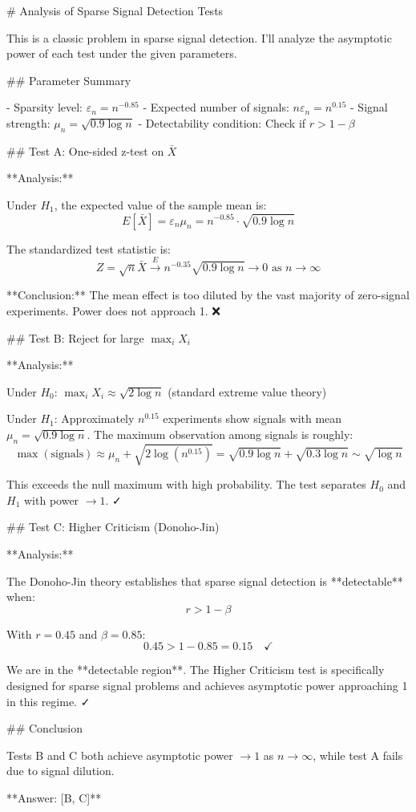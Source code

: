 # Analysis of Sparse Signal Detection Tests

This is a classic problem in sparse signal detection. I'll analyze the asymptotic power of each test under the given parameters.

## Parameter Summary

- Sparsity level: $\varepsilon_n = n^{-0.85}$
- Expected number of signals: $n\varepsilon_n = n^{0.15}$
- Signal strength: $\mu_n = \sqrt{0.9\log n}$
- Detectability condition: Check if $r > 1-\beta$

## Test A: One-sided z-test on $\bar{X}$

**Analysis:**

Under $H_1$, the expected value of the sample mean is:
$$E[\bar{X}] = \varepsilon_n \mu_n = n^{-0.85} \cdot \sqrt{0.9\log n}$$

The standardized test statistic is:
$$Z = \sqrt{n}\bar{X} \xrightarrow{E} n^{-0.35}\sqrt{0.9\log n} \to 0 \text{ as } n \to \infty$$

**Conclusion:** The mean effect is too diluted by the vast majority of zero-signal experiments. Power does not approach 1. ❌

## Test B: Reject for large $\max_i X_i$

**Analysis:**

Under $H_0$: $\max_i X_i \approx \sqrt{2\log n}$ (standard extreme value theory)

Under $H_1$: Approximately $n^{0.15}$ experiments show signals with mean $\mu_n = \sqrt{0.9\log n}$. The maximum observation among signals is roughly:
$$\max(\text{signals}) \approx \mu_n + \sqrt{2\log(n^{0.15})} = \sqrt{0.9\log n} + \sqrt{0.3\log n} \sim \sqrt{\log n}$$

This exceeds the null maximum with high probability. The test separates $H_0$ and $H_1$ with power $\to 1$. ✓

## Test C: Higher Criticism (Donoho-Jin)

**Analysis:**

The Donoho-Jin theory establishes that sparse signal detection is **detectable** when:
$$r > 1 - \beta$$

With $r = 0.45$ and $\beta = 0.85$:
$$0.45 > 1 - 0.85 = 0.15 \quad \checkmark$$

We are in the **detectable region**. The Higher Criticism test is specifically designed for sparse signal problems and achieves asymptotic power approaching 1 in this regime. ✓

## Conclusion

Tests B and C both achieve asymptotic power $\to 1$ as $n \to \infty$, while test A fails due to signal dilution.

**Answer: [B, C]**
